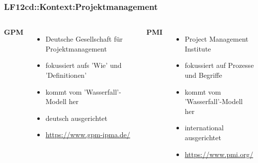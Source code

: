 \begin{frame}  
  \frametitle{LF12cd::Kontext:Projektmanagement}

  \begin{center}
  \begin{columns}[t]
    \textbf{GPM} 
    
    \vspace{0.4cm}
    \begin{itemize}
      \item Deutsche Gesellschaft für Projektmanagement
      \item fokussiert aufs 'Wie' und 'Definitionen'
      \item kommt vom 'Wasserfall'-Modell her
      \item deutsch ausgerichtet
			\item \href{https://www.gpm-ipma.de/}{https://www.gpm-ipma.de/}
    \end{itemize}
    \textbf{PMI} 
    
    \vspace{0.4cm}
    \begin{itemize}
      \item Project Management Institute
      \item fokussiert auf Prozesse und Begriffe
      \item kommt vom 'Wasserfall'-Modell her
      \item international ausgerichtet
      \item \href{https://www.pmi.org/}{https://www.pmi.org/}
    \end{itemize}
 
  \end{columns}
  \end{center}
\end{frame}

